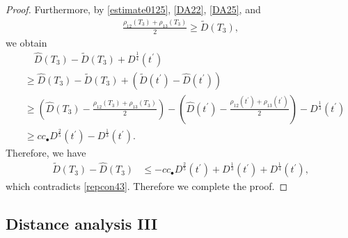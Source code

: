 \documentclass[reqno]{amsart}
\theoremstyle{plain}
\theoremstyle{definition}
\numberwithin{equation}{section}
\newcommand{\1}{\mathbbm{1}}
\begin{document}
\begin{proof}
Furthermore, by \eqref{estimate0125}, \eqref{DA22}, \eqref{DA25}, and
\begin{align*}
\frac{\rho_{12}(T_3)+\rho_{13}(T_3)}{2}\geq \tilde{D}(T_3),
\end{align*}
we obtain
\begin{align*}
&\quad \hat{D}(T_3)-\tilde{D}(T_3)+D^{\frac{1}{4}}(t^{\prime})
\\
&\geq \hat{D}(T_3)-\tilde{D}(T_3)+\left(\tilde{D}(t^{\prime})-\hat{D}(t^{\prime})\right)
\\
&\geq \left(\hat{D}(T_3)-\frac{\rho_{12}(T_3)+\rho_{13}(T_3)}{2}\right)-\left(\hat{D}(t^{\prime})-\frac{\rho_{12}(t^{\prime})+\rho_{13}(t^{\prime})}{2}\right)-D^{\frac{1}{3}}(t^{\prime})
\\
&\geq cc_{\bullet}D^{\frac{2}{5}}(t^{\prime})-D^{\frac{1}{3}}(t^{\prime}).
\end{align*}
Therefore, we have
\begin{align*}
\tilde{D}(T_3)-\hat{D}(T_3)&\leq-cc_{\bullet}D^{\frac{2}{5}}(t^{\prime})+D^{\frac{1}{3}}(t^{\prime})+D^{\frac{1}{4}}(t^{\prime}),
\end{align*}
which contradicts \eqref{repcon43}. Therefore we complete the proof.
\end{proof}

\subsection{Distance analysis III}
\end{document}
